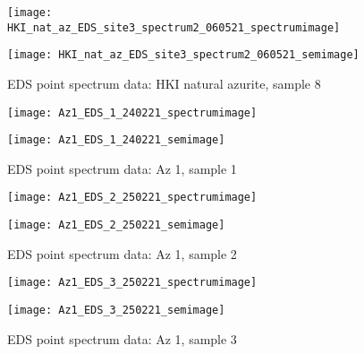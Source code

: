 \begin{figure}[H]
\centering
\begin{minipage}{.45\textwidth}
  \centering
  \texttt{[image: HKI\_nat\_az\_EDS\_site3\_spectrum2\_060521\_spectrumimage]}
\end{minipage}
\begin{minipage}{.45\textwidth}
  \centering
  \texttt{[image: HKI\_nat\_az\_EDS\_site3\_spectrum2\_060521\_semimage]}
\end{minipage}
\caption[EDS point spectrum data: HKI natural azurite, sample 8]{EDS point spectrum data: HKI natural azurite, sample 8}
\label{fig:hki_point_eds_8}
\end{figure}




\begin{figure}[H]
\centering
\begin{minipage}{.45\textwidth}
  \centering
  \texttt{[image: Az1\_EDS\_1\_240221\_spectrumimage]}
\end{minipage}
\begin{minipage}{.45\textwidth}
  \centering
  \texttt{[image: Az1\_EDS\_1\_240221\_semimage]}
\end{minipage}
\caption[EDS point spectrum data: Az 1, sample 1]{EDS point spectrum data: Az 1, sample 1}
\label{fig:az1_point_eds_1}
\end{figure}

\begin{figure}[H]
\centering
\begin{minipage}{.45\textwidth}
  \centering
  \texttt{[image: Az1\_EDS\_2\_250221\_spectrumimage]}
\end{minipage}
\begin{minipage}{.45\textwidth}
  \centering
  \texttt{[image: Az1\_EDS\_2\_250221\_semimage]}
\end{minipage}
\caption[EDS point spectrum data: Az 1, sample 2]{EDS point spectrum data: Az 1, sample 2}
\label{fig:az1_point_eds_2}
\end{figure}

\begin{figure}[H]
\centering
\begin{minipage}{.45\textwidth}
  \centering
  \texttt{[image: Az1\_EDS\_3\_250221\_spectrumimage]}
\end{minipage}
\begin{minipage}{.45\textwidth}
  \centering
  \texttt{[image: Az1\_EDS\_3\_250221\_semimage]}
\end{minipage}
\caption[EDS point spectrum data: Az 1, sample 3]{EDS point spectrum data: Az 1, sample 3}
\label{fig:az1_point_eds_3}
\end{figure}

